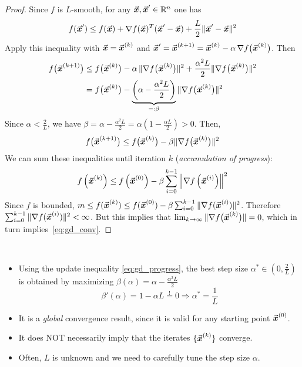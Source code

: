 \begin{proof}
Since \(f\) is \(L\)-smooth, for any \(\vec{\boldsymbol{x}},\vec{\boldsymbol{x}}'\in\mathbb{R}^{n}\) one has
\begin{equation}
\label{eq:L_smooth_gradient}
f(\vec{\boldsymbol{x}}')\le f(\vec{\boldsymbol{x}})+\nabla f(\vec{\boldsymbol{x}})^{T}(\vec{\boldsymbol{x}}'-\vec{\boldsymbol{x}})+\frac{L}{2}\|\vec{\boldsymbol{x}}'-\vec{\boldsymbol{x}}\|^{2}
\end{equation}
Apply this inequality with \(\vec{\boldsymbol{x}}=\vec{\boldsymbol{x}}^{(k)}\) and \(\vec{\boldsymbol{x}}'=\vec{\boldsymbol{x}}^{(k+1)}=\vec{\boldsymbol{x}}^{(k)}-\alpha\,\nabla f\bigl(\vec{\boldsymbol{x}}^{(k)}\bigr)\). Then
\begin{align}
f\bigl(\vec{\boldsymbol{x}}^{(k+1)}\bigr)
&\le f\bigl(\vec{\boldsymbol{x}}^{(k)}\bigr)
-\alpha\,\|\nabla f\bigl(\vec{\boldsymbol{x}}^{(k)}\bigr)\|^{2}
+\frac{\alpha^{2}L}{2}\|\nabla f\bigl(\vec{\boldsymbol{x}}^{(k)}\bigr)\|^{2} \nonumber \\
&= f\bigl(\vec{\boldsymbol{x}}^{(k)}\bigr)-\underbrace{\left(\alpha-\frac{\alpha^{2}L}{2}\right)}_{=: \beta}\|\nabla f\bigl(\vec{\boldsymbol{x}}^{(k)}\bigr)\|^{2} \label{eq:gd_Lsmooth}
\end{align}
Since \(\alpha < \frac{2}{L}\), we have \(\beta = \alpha - \frac{\alpha^{2}L}{2} = \alpha\left(1-\frac{\alpha L}{2}\right) > 0\). Then,
\begin{equation}
\label{eq:gd_progress}
f\bigl(\vec{\boldsymbol{x}}^{(k+1)}\bigr)\le f\bigl(\vec{\boldsymbol{x}}^{(k)}\bigr)-\beta\|\nabla f\bigl(\vec{\boldsymbol{x}}^{(k)}\bigr)\|^{2}
\end{equation}
We can sum these inequalities until iteration \(k\) (\emph{accumulation of progress}):
\[
f\left(\vec{\boldsymbol{x}}^{(k)}\right) \le f\left(\vec{\boldsymbol{x}}^{(0)}\right) - \beta\sum_{i=0}^{k-1}\left\|\nabla f\left(\vec{\boldsymbol{x}}^{(i)}\right)\right\|^{2}
\]
Since \(f\) is bounded, 
\(
m \le f(\vec{\boldsymbol{x}}^{(k)}) \le f(\vec{\boldsymbol{x}}^{(0)}) - \beta\sum_{i=0}^{k-1}\|\nabla f(\vec{\boldsymbol{x}}^{(i)})\|^{2}
\).
Therefore 
\(
\sum_{i=0}^{k-1}\|\nabla f(\vec{\boldsymbol{x}}^{(i)})\|^{2} < \infty
\).
But this implies that
\(
\lim_{k\to\infty}\|\nabla f\bigl(\vec{\boldsymbol{x}}^{(k)}\bigr)\|=0
\), which in turn implies~\eqref{eq:gd_conv}.
\end{proof}

\begin{remark}\
\begin{itemize}
\item Using the update inequality \eqref{eq:gd_progress}, the best step size \(\alpha^{*} \in \left(0,\frac{2}{L}\right)\) is obtained by maximizing
\(
\beta(\alpha)=\alpha-\frac{\alpha^{2}L}{2}
\)
\[
\beta'(\alpha) = 1 - \alpha L \overset{!}{=} 0 \Rightarrow \alpha^{*} = \frac{1}{L}
\]
\item It is a \emph{global} convergence result, since it is valid for any starting point \(\vec{\boldsymbol{x}}^{(0)}\).
\item It does NOT necessarily imply that the iterates \(\{\vec{\boldsymbol{x}}^{(k)}\}\) converge.
\item Often, \(L\) is unknown and we need to carefully tune the step size \(\alpha\).
\end{itemize}
\end{remark}


